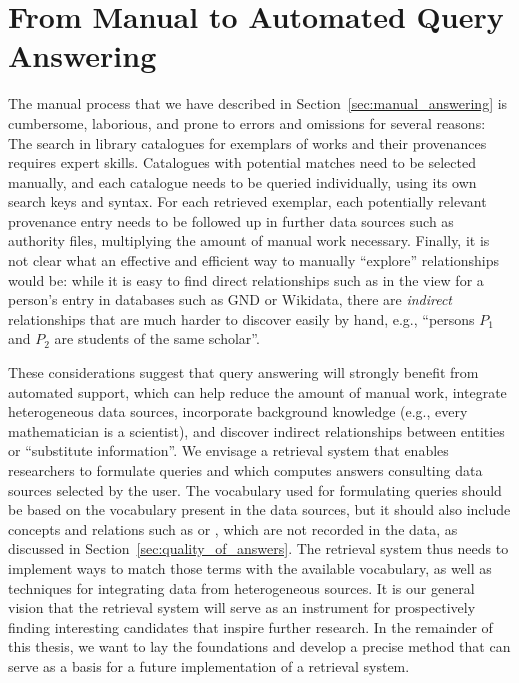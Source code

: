 \section{From Manual to Automated Query Answering}
\label{sec:manual_vs_automated}

The manual process that we have described in Section~\ref{sec:manual_answering}
is cumbersome, laborious, and prone to errors and omissions for several reasons:
The search in library catalogues for exemplars of works and their provenances requires expert skills.
Catalogues with potential matches need to be selected manually,
and each catalogue needs to be queried individually, using its own search keys and syntax. 
For each retrieved exemplar, each potentially relevant provenance entry 
needs to be followed up in further data sources such as authority files,
multiplying the amount of manual work necessary.
Finally, it is not clear what an effective and efficient way to manually \enquote{explore}
relationships would be:
while it is easy to find direct relationships such as  in the view for a person's entry
in databases such as \gls{GND} or Wikidata, there are \emph{indirect} relationships
that are much harder to discover easily by hand,
e.g., \enquote{persons $P_1$ and $P_2$ are students of the same scholar}.

These considerations suggest that query answering will
strongly benefit from automated support,
which can help reduce the amount of manual work, integrate heterogeneous data sources,
incorporate background knowledge (e.g., every mathematician is a scientist),
and discover indirect relationships between entities or \enquote{substitute information}.
We envisage a retrieval system that enables researchers to formulate queries 
and which computes answers consulting data sources selected by the user.
The vocabulary used for formulating queries should be based on the vocabulary
present in the data sources, but it should also include concepts and relations
such as  or ,
which are not recorded in the data, as discussed in
Section~\ref{sec:quality_of_answers}. The retrieval system thus needs to implement ways
to match those terms with the available vocabulary, as well as techniques
for integrating data from heterogeneous sources.
It is our general vision that the retrieval system will serve as an instrument for prospectively finding interesting
candidates that inspire further research.
In the remainder of this thesis, we want to lay the foundations and develop a precise method
that can serve as a basis for a future implementation of a retrieval system.

